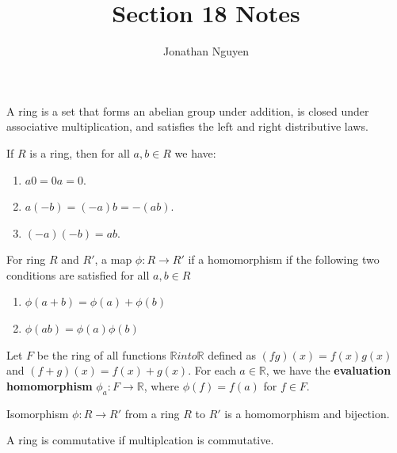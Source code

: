 \documentclass[11pt]{article}
\title{Section 18 Notes}
\author{Jonathan Nguyen}
\date{}
\begin{document}
\maketitle

\begin{definition}[Ring]
A ring is a set that forms an abelian group under addition,
is closed under associative multiplication, and satisfies
the left and right distributive laws.
\end{definition}

\begin{theorem}
If $R$ is a ring, then for all $a,b \in R$ we have:
\begin{enumerate}
    \item $a0 = 0a = 0$.
    \item $a(-b) = (-a)b = -(ab)$.
    \item $(-a)(-b) = ab$.
\end{enumerate}
\end{theorem}

\begin{definition}[Homomorphism]
For ring $R$ and $R'$, a map $\phi: R \rightarrow R'$ if a homomorphism if the following two conditions are satisfied for all $a, b \in R$
\begin{enumerate}
    \item $\phi(a + b) = \phi(a) + \phi(b)$
    \item $\phi(ab) = \phi(a)\phi(b)$
\end{enumerate}
\end{definition}

\begin{definition}
    Let $F$ be the ring of all functions $\mathbb{R} into \mathbb{R}$ defined as $(fg)(x) = f(x)g(x)$ and $(f+g)(x) = f(x) + g(x)$.
    For each $a \in \mathbb{R}$, we have the \textbf{evaluation homomorphism} $\phi_a: F \rightarrow \mathbb{R}$, where 
    $\phi(f) = f(a)$ for $f \in F$.
\end{definition}

\begin{definition}[Isomorphism]
    Isomorphism $\phi: R \rightarrow R'$ from a ring $R$ to $R'$ is a homomorphism and bijection.
\end{definition}

\begin{definition}
    A ring is commutative if multiplcation is commutative.
\end{definition}
\end{document}
